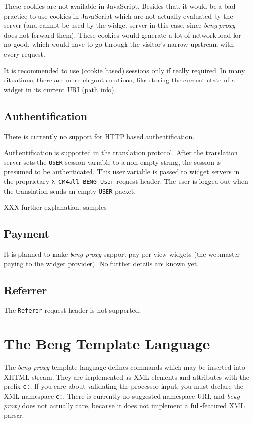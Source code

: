 \documentclass[a4paper,12pt]{article}
\begin{document}
These cookies are not available in JavaScript.  Besides that, it would
be a bad practice to use cookies in JavaScript which are not actually
evaluated by the server (and cannot be used by the widget server in
this case, since \emph{beng-proxy} does not forward them).  These
cookies would generate a lot of network load for no good, which would
have to go through the visitor's narrow upstream with every request.

It is recommended to use (cookie based) sessions only if really
required.  In many situations, there are more elegant solutions, like
storing the current state of a widget in its current URI (path info).

\subsection{Authentification}

There is currently no support for HTTP based authentification.

Authentification is supported in the translation protocol.  After the
translation server sets the \texttt{USER} session variable to a
non-empty string, the session is presumed to be authenticated.  This
user variable is passed to widget servers in the proprietary
\texttt{X-CM4all-BENG-User} request header.  The user is logged out
when the translation sends an empty \texttt{USER} packet.

XXX further explanation, samples


\subsection{Payment}

It is planned to make \emph{beng-proxy} support pay-per-view widgets
(the webmaster paying to the widget provider).  No further details are
known yet.


\subsection{Referrer}

The \texttt{Referer} request header is not supported.


\section{The Beng Template Language}
\label{processor}

The \emph{beng-proxy} template language defines commands which may be
inserted into XHTML stream.  They are implemented as XML elements and
attributes with the prefix \texttt{c:}.  If you care about validating
the processor input, you must declare the XML namespace \texttt{c:}.
There is currently no suggested namespace URI, and \emph{beng-proxy}
does not actually care, because it does not implement a full-featured
XML parser.
\end{document}
